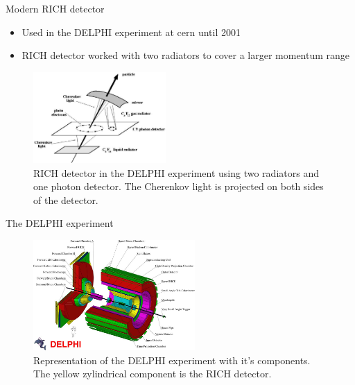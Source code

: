 \documentclass[aspectratio=1610, 10pt]{beamer}
\begin{document}
\begin{frame}{Modern RICH detector}
  \begin{itemize}
    \item Used in the DELPHI experiment at cern until 2001
    \medskip
    \item RICH detector worked with two radiators to cover a larger momentum range
  \end{itemize}
  \begin{figure}
    \includegraphics[width=0.45\textwidth]{images/rich_delphi.png}
    \caption{RICH detector in the DELPHI experiment using two radiators and one photon detector. The Cherenkov light is projected on both
    sides of the detector.}
  \end{figure}
\end{frame}

\begin{frame}{The DELPHI experiment}
  \begin{figure}
    \includegraphics[width=0.55\textwidth]{images/delphi.jpg}
    \caption{Representation of the DELPHI experiment with it's components. The yellow zylindrical component is the RICH detector.}
  \end{figure}
\end{frame}
\end{document}
